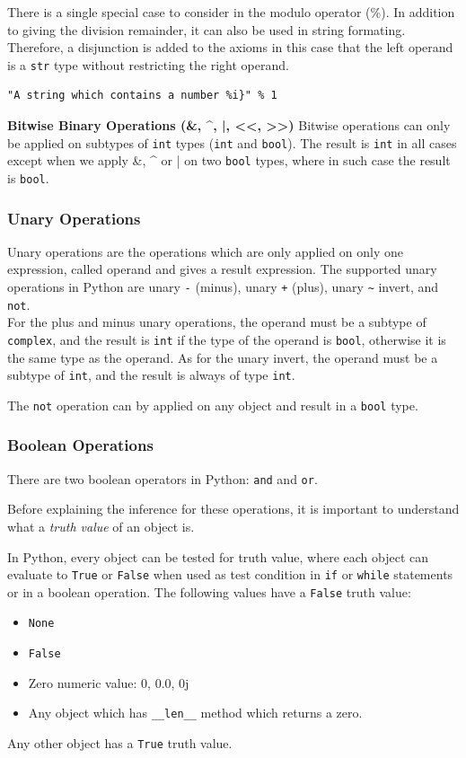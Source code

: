 There is a single special case to consider in the modulo operator (\%). In addition to giving the division remainder, it can also be used in string formating. Therefore, a disjunction is added to the axioms in this case that the left operand is a \lstinline|str| type without restricting the right operand.

\begin{lstlisting}
"A string which contains a number %i}" % 1
\end{lstlisting}

\textbf{Bitwise Binary Operations (\&, \textrm{\^}, |, <<, >>)}
Bitwise operations can only be applied on subtypes of \lstinline|int| types (\lstinline|int| and \lstinline|bool|). The result is \lstinline|int| in all cases except when we apply \&, \textrm{\^} or | on two \lstinline|bool| types, where in such case the result is \lstinline|bool|.

\subsubsection{Unary Operations}
Unary operations are the operations which are only applied on only one expression, called operand and gives a result expression. The supported unary operations in Python are unary \lstinline|-| (minus), unary \lstinline|+| (plus), unary \lstinline|~| invert, and \lstinline|not|.\\

For the plus and minus unary operations, the operand must be a subtype of \lstinline|complex|, and the result is \lstinline|int| if the type of the operand is \lstinline|bool|, otherwise it is the same type as the operand. As for the unary invert, the operand must be a subtype of \lstinline|int|, and the result is always of type \lstinline|int|.

The \lstinline|not| operation can by applied on any object and result in a \lstinline|bool| type.


\subsubsection{Boolean Operations}
There are two boolean operators in Python: \lstinline|and| and \lstinline|or|.

Before explaining the inference for these operations, it is important to understand what a \textit{truth value} of an object is.

In Python, every object can be tested for truth value, where each object can evaluate to \lstinline|True| or \lstinline|False| when used as test condition in \lstinline|if| or \lstinline|while| statements or in a boolean operation. The following values have a \lstinline|False| truth value:
\begin{itemize}
	\item \lstinline|None|
	\item \lstinline|False|
	\item Zero numeric value: 0, 0.0, 0j
	\item Any object which has \lstinline|__len__| method which returns a zero.
\end{itemize}
Any other object has a \lstinline|True| truth value. \\

